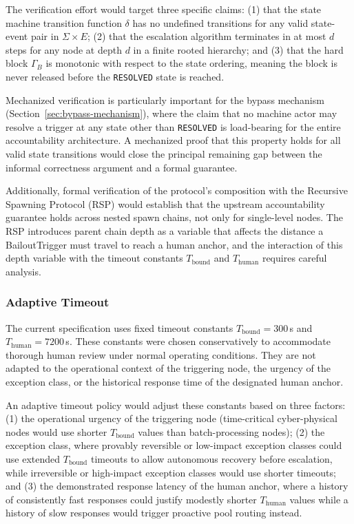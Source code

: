 The verification effort would target three specific claims: (1) that the state machine transition function $\delta$ has no undefined transitions for any valid state-event pair in $\Sigma \times E$; (2) that the escalation algorithm terminates in at most $d$ steps for any node at depth $d$ in a finite rooted hierarchy; and (3) that the hard block $\Gamma_B$ is monotonic with respect to the state ordering, meaning the block is never released before the \texttt{RESOLVED} state is reached.

Mechanized verification is particularly important for the bypass mechanism (Section~\ref{sec:bypass-mechanism}), where the claim that no machine actor may resolve a trigger at any state other than \texttt{RESOLVED} is load-bearing for the entire accountability architecture. A mechanized proof that this property holds for all valid state transitions would close the principal remaining gap between the informal correctness argument and a formal guarantee.

Additionally, formal verification of the protocol's composition with the Recursive Spawning Protocol (RSP) would establish that the upstream accountability guarantee holds across nested spawn chains, not only for single-level nodes. The RSP introduces parent chain depth as a variable that affects the distance a BailoutTrigger must travel to reach a human anchor, and the interaction of this depth variable with the timeout constants $T_{\text{bound}}$ and $T_{\text{human}}$ requires careful analysis.

\subsubsection{Adaptive Timeout}\label{sec:adaptive-timeout}

The current specification uses fixed timeout constants $T_{\text{bound}}=300$\,s and $T_{\text{human}}=7200$\,s. These constants were chosen conservatively to accommodate thorough human review under normal operating conditions. They are not adapted to the operational context of the triggering node, the urgency of the exception class, or the historical response time of the designated human anchor.

An adaptive timeout policy would adjust these constants based on three factors: (1) the operational urgency of the triggering node (time-critical cyber-physical nodes would use shorter $T_{\text{bound}}$ values than batch-processing nodes); (2) the exception class, where provably reversible or low-impact exception classes could use extended $T_{\text{bound}}$ timeouts to allow autonomous recovery before escalation, while irreversible or high-impact exception classes would use shorter timeouts; and (3) the demonstrated response latency of the human anchor, where a history of consistently fast responses could justify modestly shorter $T_{\text{human}}$ values while a history of slow responses would trigger proactive pool routing instead.

